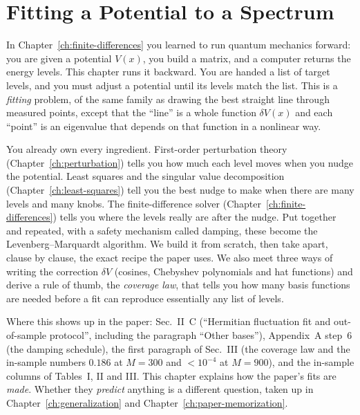 \chapter{Fitting a Potential to a Spectrum}\label{ch:fitting}

\begin{chapterintro}
In Chapter~\ref{ch:finite-differences} you learned to run quantum mechanics forward: you are given a potential $V(x)$, you build a matrix, and a computer returns the energy levels. This chapter runs it backward. You are handed a list of target levels, and you must adjust a potential until its levels match the list. This is a \emph{fitting} problem, of the same family as drawing the best straight line through measured points, except that the ``line'' is a whole function $\delta V(x)$ and each ``point'' is an eigenvalue that depends on that function in a nonlinear way.

You already own every ingredient. First-order perturbation theory (Chapter~\ref{ch:perturbation}) tells you how much each level moves when you nudge the potential. Least squares and the singular value decomposition (Chapter~\ref{ch:least-squares}) tell you the best nudge to make when there are many levels and many knobs. The finite-difference solver (Chapter~\ref{ch:finite-differences}) tells you where the levels really are after the nudge. Put together and repeated, with a safety mechanism called damping, these become the Levenberg--Marquardt algorithm. We build it from scratch, then take apart, clause by clause, the exact recipe the paper uses. We also meet three ways of writing the correction $\delta V$ (cosines, Chebyshev polynomials and hat functions) and derive a rule of thumb, the \emph{coverage law}, that tells you how many basis functions are needed before a fit can reproduce essentially any list of levels.

Where this shows up in the paper: Sec.~II~C (``Hermitian fluctuation fit and out-of-sample protocol'', including the paragraph ``Other bases''), Appendix~A step~6 (the damping schedule), the first paragraph of Sec.~III (the coverage law and the in-sample numbers $0.186$ at $M=300$ and $<10^{-4}$ at $M=900$), and the in-sample columns of Tables~I, II and III. This chapter explains how the paper's fits are \emph{made}. Whether they \emph{predict} anything is a different question, taken up in Chapter~\ref{ch:generalization} and Chapter~\ref{ch:paper-memorization}.
\end{chapterintro}

